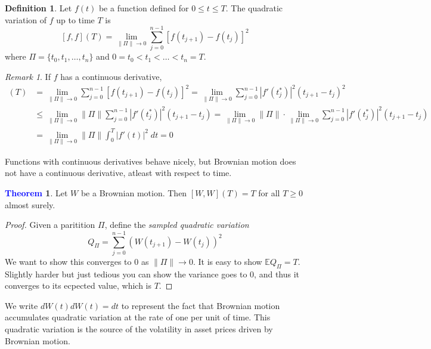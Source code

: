 \documentclass[11pt]{article}
\theoremstyle{definition}
\theoremstyle{definition}
\newtheorem{theorem}{\textcolor{blue}{Theorem}}
\theoremstyle{definition}
\newtheorem{definition}{\textcolor{OliveGreen}{Definition}}
\theoremstyle{remark}
\newtheorem*{remark}{Remark}
\begin{document}
\begin{definition}
    Let $f(t)$ be a function defined for $0 \leq t \leq T$. The quadratic variation of $f$ up to time $T$ is
    \[
        [f, f](T) = \lim_{\| \Pi \| \to 0 } \sum_{j = 0}^{n - 1}[f(t_{j + 1}) - f(t_j)]^2
    \]     
    where $\Pi= \{t_0, t_1, \dots, t_n\}$ and $0 = t_0 < t_1 < \dots < t_n = T$. 
\end{definition}

\begin{remark}
    If $f$ has a continuous derivative,
    \begin{align*}
        [f, f](T) &= \lim_{\| \Pi \| \to 0 } \sum_{j = 0}^{n - 1}[f(t_{j + 1}) - f(t_j)]^2 = \lim_{\| \Pi \| \to 0 } \sum_{j = 0}^{n - 1}|f'(t_j^*)|^2(t_{j + 1} - t_j)^2 \\
        &\leq \lim_{\| \Pi \| \to 0 } \| \Pi \| \sum_{j = 0}^{n - 1}|f'(t_j^*)|^2(t_{j + 1} - t_j) = \lim_{\| \Pi \| \to 0 } \| \Pi \| \cdot \lim_{\| \Pi \| \to 0} \sum_{j = 0}^{n - 1} |f'(t_j^*)|^2(t_{j + 1} - t_j) \\
        &= \lim_{\| \Pi \| \to 0 } \| \Pi \| \int_0^T |f'(t)|^2 \; dt = 0
    \end{align*}
\end{remark}

Functions with continuous derivatives behave nicely, but Brownian motion does not have a continuous derivative, atleast with respect
to time.

\begin{theorem}
    Let $W$ be a Brownian motion. Then $[W, W](T) = T$ for all $T \geq 0$ almost surely.   
\end{theorem}
\begin{proof}
    Given a paritition $\Pi$, define the \textit{sampled quadratic variation}
    \[
        Q_{\Pi} = \sum_{j = 0}^{n - 1} (W(t_{j + 1}) - W(t_j))^2
    \]  
    We want to show this converges to $0$ as $\| \Pi \| \to 0$. 
    It is easy to show $\mathbb{E}Q_{\Pi} = T$. Slightly harder but just tedious you can show the variance goes to $0$,
    and thus it converges to its ecpected value, which is $T$. 
\end{proof}

We write $dW(t) dW(t) = dt$ to represent the fact that Brownian motion accumulates quadratic variation at 
the rate of one per unit of time. This quadratic variation is the source of the volatility in asset prices 
driven by Brownian motion. 
\end{document}
